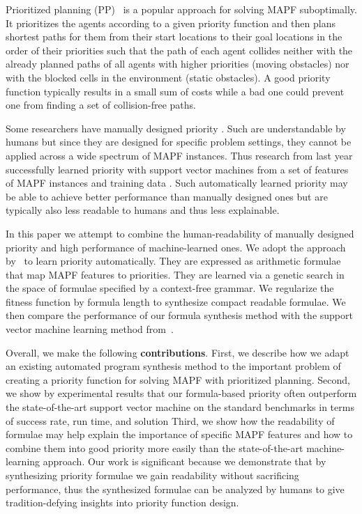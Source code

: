 \documentclass[letterpaper]{article} %
\begin{document}
Prioritized planning (PP)~\citep{latombe1991multiple,bennewitz22finding,silver25cooperative,van25prioritized} is a popular approach for solving MAPF suboptimally. It prioritizes the agents according to a given priority function and then plans shortest paths for them from their start locations to their goal locations in the order of their priorities such that the path of each agent collides neither with the already planned paths of all agents with higher priorities (moving obstacles) nor with the blocked cells in the environment (static obstacles). A good priority function typically results in a small sum of costs while a bad one could prevent one from finding a set of collision-free paths.

Some researchers have manually designed priority \citep{van25prioritized, wang219new, wu22multi, buckley1988fast, li219coupling}. Such are understandable by humans but since they are designed for specific problem settings, they cannot be applied across a wide spectrum of MAPF instances. Thus research from last year successfully learned priority with support vector machines from a set of features of MAPF instances and training data \citep{zhang222learning}. Such automatically learned priority may be able to achieve better performance than manually designed ones but are typically also less readable to humans and thus less explainable.

In this paper we attempt to combine the human-readability of manually designed priority and high performance of machine-learned ones. We adopt the approach by~\citet{bulitko222portability} to learn priority automatically. They are expressed as arithmetic formulae that map MAPF features to priorities. They are learned via a genetic search in the space of formulae specified by a context-free grammar. We regularize the fitness function by formula length to synthesize compact readable formulae. We then compare the performance of our formula synthesis method with the support vector machine learning method from~\citet{zhang222learning}.

Overall, we make the following \textbf{contributions}. First, we describe how we adapt an existing automated program synthesis method to the important problem of creating a priority function for solving MAPF with prioritized planning. Second, we show by experimental results that our formula-based priority often outperform the state-of-the-art support vector machine on the standard benchmarks in terms of success rate, run time, and solution  Third, we show how the readability of formulae may help explain the importance of specific MAPF features and how to combine them into good priority more easily than the state-of-the-art machine-learning approach. Our work is significant because we demonstrate that by synthesizing priority formulae we gain readability without sacrificing performance, thus the synthesized formulae can be analyzed by humans to give tradition-defying insights into priority function design.
\end{document}
